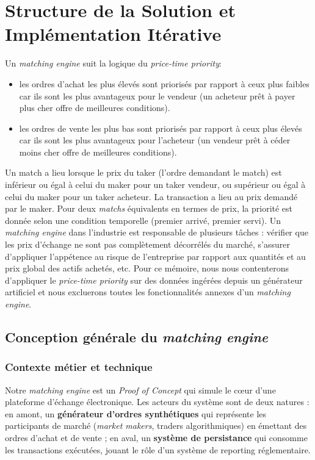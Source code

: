 \section{Structure de la Solution et Implémentation Itérative}

Un \textit{matching engine} suit la logique du \textit{price-time priority}: 
\begin{itemize}
    \item les ordres d'achat les plus élevés sont priorisés par rapport à ceux plus faibles car ils sont les plus avantageux pour le vendeur (un acheteur prêt à payer plus cher offre de meilleures conditions).
    \item les ordres de vente les plus bas sont priorisés par rapport à ceux plus élevés car ils sont les plus avantageux pour l'acheteur (un vendeur prêt à céder moins cher offre de meilleures conditions).

\end{itemize}


Un match a lieu lorsque le prix du taker (l'ordre demandant le match) est inférieur ou égal à celui du maker pour un taker vendeur, ou supérieur ou égal à celui du maker pour un taker acheteur. La transaction a lieu au prix demandé par le maker. Pour deux \textit{matchs} équivalents en termes de prix, la priorité est donnée selon une condition temporelle (premier arrivé, premier servi). Un \textit{matching engine} dans l'industrie est responsable de plusieurs tâches : vérifier que les prix d'échange ne sont pas complètement décorrélés du marché, s'assurer d'appliquer l'appétence au risque de l'entreprise par rapport aux quantités et au prix global des actifs achetés, etc. Pour ce mémoire, nous nous contenterons d'appliquer le \textit{price-time priority} sur des données ingérées depuis un générateur artificiel et nous excluerons toutes les fonctionnalités annexes d'un \textit{matching engine}.

\subsection{Conception générale du \textit{matching engine}}

\subsubsection{Contexte métier et technique}

Notre \textit{matching engine} est un \textit{Proof of Concept} qui simule le cœur d'une plateforme d'échange électronique. Les acteurs du système sont de deux natures : en amont, un \textbf{générateur d'ordres synthétiques} qui représente les participants de marché (\textit{market makers}, traders algorithmiques) en émettant des ordres d'achat et de vente ; en aval, un \textbf{système de persistance} qui consomme les transactions exécutées, jouant le rôle d'un système de reporting réglementaire.

